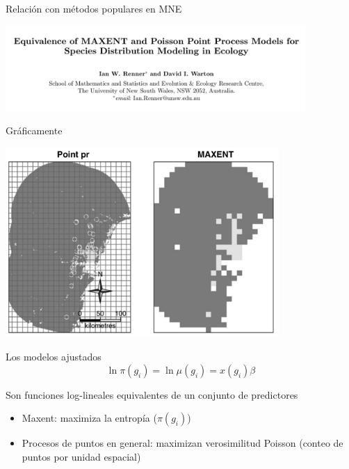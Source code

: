 \documentclass[
  11pt,
  ignorenonframetext,
]{beamer}
\begin{document}
\begin{frame}{Relación con métodos populares en MNE}
\protect\hypertarget{relaciuxf3n-con-muxe9todos-populares-en-mne}{}
\begin{center}\includegraphics[width=4.49in]{Figuras/Equivalencia-maxent} \end{center}
\end{frame}

\begin{frame}{Gráficamente}
\protect\hypertarget{gruxe1ficamente}{}
\begin{center}\includegraphics[width=4.09in]{Figuras/Maxent-PPMs} \end{center}
\end{frame}

\begin{frame}{Los modelos ajustados}
\protect\hypertarget{los-modelos-ajustados}{}
\[\ln \pi(g_i ) = \ln \mu(g_i ) = x(g_i) \beta\]

Son funciones log-lineales equivalentes de un conjunto de predictores

\begin{itemize}
\item
  Maxent: maximiza la entropía (\(\pi (g_i)\))
\item
  Procesos de puntos en general: maximizan verosimilitud Poisson (conteo
  de puntos por unidad espacial)
\end{itemize}
\end{frame}
\end{document}
